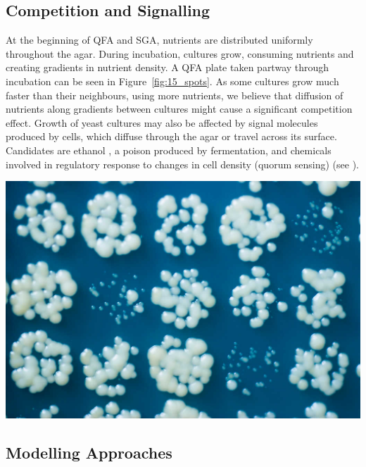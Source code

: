 \begin{multicols}{2}


\subsection{Competition and Signalling}

At the beginning of QFA and SGA, nutrients are distributed uniformly throughout the
agar. During incubation, cultures grow, consuming nutrients and creating gradients in
nutrient density. A QFA plate taken partway through incubation can be
seen in Figure~\ref{fig:15_spots}. As some cultures grow much faster than their
neighbours, using more nutrients, we believe that diffusion of nutrients along gradients
between cultures might cause a significant competition effect. Growth of yeast cultures
may also be affected by signal molecules produced by cells, which diffuse through the
agar or travel across its surface. Candidates are ethanol \citep{fujita2006}, a poison
produced by fermentation, and chemicals involved in regulatory response
to changes in cell density (quorum sensing) (see \citet{sprague2006,honigberg2011}).

\begin{Figure}
  \centering
  \includegraphics[width=\linewidth]{5658435523_c2e43729f1_b}
  \label{fig:15_spots}
\end{Figure}

\subsection{Modelling Approaches}


\end{multicols}
